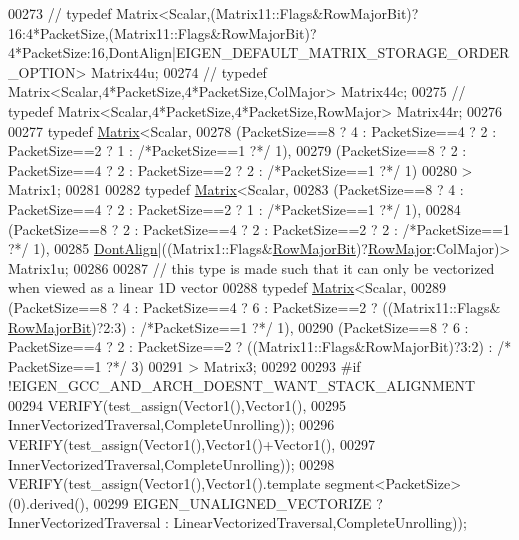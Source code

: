 \begin{DoxyCode}
00273 \textcolor{comment}{//     typedef
       Matrix<Scalar,(Matrix11::Flags&RowMajorBit)?16:4*PacketSize,(Matrix11::Flags&RowMajorBit)?4*PacketSize:16,DontAlign|EIGEN\_DEFAULT\_MATRIX\_STORAGE\_ORDER\_OPTION> Matrix44u;}
00274 \textcolor{comment}{//     typedef Matrix<Scalar,4*PacketSize,4*PacketSize,ColMajor> Matrix44c;}
00275 \textcolor{comment}{//     typedef Matrix<Scalar,4*PacketSize,4*PacketSize,RowMajor> Matrix44r;}
00276 
00277     \textcolor{keyword}{typedef} \hyperlink{group___core___module_class_eigen_1_1_matrix}{Matrix}<Scalar,
00278         (PacketSize==8 ? 4 : PacketSize==4 ? 2 : PacketSize==2 ? 1 : \textcolor{comment}{/*PacketSize==1 ?*/} 1),
00279         (PacketSize==8 ? 2 : PacketSize==4 ? 2 : PacketSize==2 ? 2 : \textcolor{comment}{/*PacketSize==1 ?*/} 1)
00280       > Matrix1;
00281 
00282     \textcolor{keyword}{typedef} \hyperlink{group___core___module_class_eigen_1_1_matrix}{Matrix}<Scalar,
00283         (PacketSize==8 ? 4 : PacketSize==4 ? 2 : PacketSize==2 ? 1 : \textcolor{comment}{/*PacketSize==1 ?*/} 1),
00284         (PacketSize==8 ? 2 : PacketSize==4 ? 2 : PacketSize==2 ? 2 : \textcolor{comment}{/*PacketSize==1 ?*/} 1),
00285       \hyperlink{group__enums_ggaacded1a18ae58b0f554751f6cdf9eb13a40a452614141522dd313363dbbd65726}{DontAlign}|((Matrix1::Flags&\hyperlink{group__flags_gae4f56c2a60bbe4bd2e44c5b19cbe8762}{RowMajorBit})?\hyperlink{group__enums_ggaacded1a18ae58b0f554751f6cdf9eb13acfcde9cd8677c5f7caf6bd603666aae3}{RowMajor}:ColMajor)> Matrix1u;
00286 
00287     \textcolor{comment}{// this type is made such that it can only be vectorized when viewed as a linear 1D vector}
00288     \textcolor{keyword}{typedef} \hyperlink{group___core___module_class_eigen_1_1_matrix}{Matrix}<Scalar,
00289         (PacketSize==8 ? 4 : PacketSize==4 ? 6 : PacketSize==2 ? ((Matrix11::Flags&
      \hyperlink{group__flags_gae4f56c2a60bbe4bd2e44c5b19cbe8762}{RowMajorBit})?2:3) : \textcolor{comment}{/*PacketSize==1 ?*/} 1),
00290         (PacketSize==8 ? 6 : PacketSize==4 ? 2 : PacketSize==2 ? ((Matrix11::Flags&RowMajorBit)?3:2) : \textcolor{comment}{/*
      PacketSize==1 ?*/} 3)
00291       > Matrix3;
00292     
00293 \textcolor{preprocessor}{    #if !EIGEN\_GCC\_AND\_ARCH\_DOESNT\_WANT\_STACK\_ALIGNMENT}
00294     VERIFY(test\_assign(Vector1(),Vector1(),
00295       InnerVectorizedTraversal,CompleteUnrolling));
00296     VERIFY(test\_assign(Vector1(),Vector1()+Vector1(),
00297       InnerVectorizedTraversal,CompleteUnrolling));
00298     VERIFY(test\_assign(Vector1(),Vector1().\textcolor{keyword}{template} segment<PacketSize>(0).derived(),
00299       EIGEN\_UNALIGNED\_VECTORIZE ? InnerVectorizedTraversal : LinearVectorizedTraversal,CompleteUnrolling));

\end{DoxyCode}
